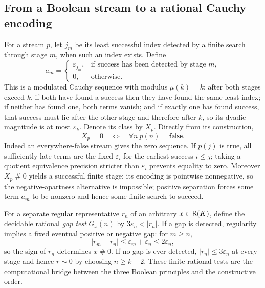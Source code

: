 \documentclass[11pt,reqno]{amsart}
\theoremstyle{definition}\newtheorem{definition}[theorem]{Definition}
\theoremstyle{remark}\newtheorem{remark}[theorem]{Remark}
\newcommand{\eps}{\varepsilon}
\newcommand{\Apt}{\mathrel{\#}}
\begin{document}
\subsection{From a Boolean stream to a rational Cauchy encoding}\label{main:sub-54}
For a stream $p$, let $j_m$ be its least successful index detected by a finite search through stage $m$, when such an index exists. Define
\[
a_m=\begin{cases}\eps_{j_m},&\text{if success has been detected by stage }m,\\0,&\text{otherwise.}\end{cases}
\]
This is a modulated Cauchy sequence with modulus $\mu(k)=k$: after both stages exceed $k$, if both have found a success then they have found the same least index; if neither has found one, both terms vanish; and if exactly one has found success, that success must lie after the other stage and therefore after $k$, so its dyadic magnitude is at most $\eps_k$. Denote its class by $X_p$. Directly from its construction,
\begin{equation}\label{eq:boolean}
X_p=0\quad\Longleftrightarrow\quad \forall n\ p(n)=\mathsf{false}.
\end{equation}
Indeed an everywhere-false stream gives the zero sequence. If $p(j)$ is true, all sufficiently late terms are the fixed $\eps_i$ for the earliest success $i\le j$; taking a quotient equivalence precision stricter than $\eps_i$ prevents equality to zero. Moreover $X_p\Apt0$ yields a successful finite stage: its encoding is pointwise nonnegative, so the negative-apartness alternative is impossible; positive separation forces some term $a_m$ to be nonzero and hence some finite search to succeed.

For a separate regular representative $r_n$ of an arbitrary $x\in\mathsf R(K)$, define the decidable rational \emph{gap test} $G_x(n)$ by $3\eps_n<|r_n|$. If a gap is detected, regularity implies a fixed eventual positive or negative gap: for $m\ge n$,
\[
|r_m-r_n|\le\eps_m+\eps_n\le2\eps_n,
\]
so the sign of $r_n$ determines $x\Apt0$. If no gap is ever detected, $|r_n|\le3\eps_n$ at every stage and hence $r\sim0$ by choosing $n\ge k+2$. These finite rational tests are the computational bridge between the three Boolean principles and the constructive order.
\end{document}
